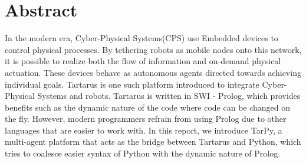 \newpage
\chapter*{\centering Abstract}
\large
In the modern era, Cyber-Physical Systems(CPS) use Embedded devices to control physical processes. By tethering robots as mobile nodes onto this network, it is possible to realize both the flow of information and on-demand physical actuation. These devices behave as autonomous agents directed towards achieving individual goals. Tartarus is one such platform introduced to integrate Cyber-Physical Systems and robots. Tartarus is written in SWI - Prolog, which provides benefits such as the dynamic nature of the code where code can be changed on the fly. However, modern programmers refrain from using Prolog due to other languages that are easier to work with. In this report, we introduce TarPy, a multi-agent platform that acts as the bridge between Tartarus and Python, which tries to coalesce easier syntax of Python with the dynamic nature of Prolog.